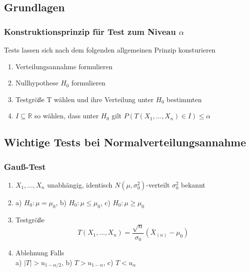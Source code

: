 \documentclass[
	ngerman,
	accentcolor=9c,%
	type=intern,
	marginpar=false
	]{tudapub}
\begin{document}
            \subsection{Grundlagen}
                \subsubsection*{Konstruktionsprinzip für Test zum Niveau $\alpha$}
                    Tests lassen sich nach dem folgenden allgemeinen Prinzip konsturieren
                    \begin{enumerate}
                        \item Verteilungsannahme formulieren
                        \item Nullhypothese $H_0$ formulieren
                        \item Testgröße T wählen und ihre Verteilung unter $H_0$ bestimmten
                        \item $I \subseteq \mathbb{R}$ so wählen, dass unter $H_0$ gilt $P(T(X_1,\dots,X_n)\in I) \leq \alpha$
                    \end{enumerate}
            \subsection{Wichtige Tests bei Normalverteilungsannahme}
                \subsubsection*{Gauß-Test}
                     \begin{enumerate}
                         \item $X_1,\dots,X_n$ unabhängig, identisch $N(\mu, \sigma^2_0)$-verteilt $\sigma^2_0$ bekannt
                         \item a) $H_0: \mu = \mu_0$, b) $H_0: \mu \leq \mu_0$, c) $H_0: \mu \geq \mu_0$     
                         \item Testgröße
                         \begin{equation*}
                             T(X_1,\dots,X_n)=\dfrac{\sqrt{n}}{\sigma_0}(\bar{X}_{(n)}-\mu_0)
                         \end{equation*} 
                         \item Ablehnung Falls\\
                               a) $|T| > u_{1-\alpha/2}$, b) $T > u_{1-\alpha}$, c) $T < u_{\alpha}$
                     \end{enumerate}
\end{document}
